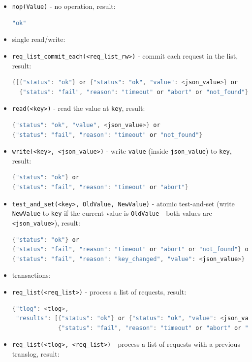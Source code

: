 \documentclass[a4paper]{scrreprt}
\newcommand{\code}[1]{\lstinline[basicstyle=\ttfamily]!#1!}
\begin{document}
\begin{itemize}
  \item \code{nop(Value)} - no operation, result:
\begin{lstlisting}[language=java]
"ok"
\end{lstlisting}
  \item[] \hspace{-1.7em}single read/write:
  \item \code{req_list_commit_each(<req_list_rw>)} - commit each request in the list, result:
\begin{lstlisting}[language=java]
{[{"status": "ok"} or {"status": "ok", "value": <json_value>} or
  {"status": "fail", "reason": "timeout" or "abort" or "not_found"}]}
\end{lstlisting}
  \item \code{read(<key>)} - read the value at \code{key}, result:
\begin{lstlisting}[language=java]
{"status": "ok", "value", <json_value>} or
{"status": "fail", "reason": "timeout" or "not_found"}
\end{lstlisting}
  \item \code{write(<key>, <json_value>)} - write \code{value} (inside \code{json_value}) to \code{key}, result:
\begin{lstlisting}[language=java]
{"status": "ok"} or
{"status": "fail", "reason": "timeout" or "abort"}
\end{lstlisting}
  \item \code{test_and_set(<key>, OldValue, NewValue)} - atomic test-and-set
  (write \code{NewValue} to \code{key} if the current value is \code{OldValue}
   - both values are \code{<json_value>}), result:
\begin{lstlisting}[language=java]
{"status": "ok"} or
{"status": "fail", "reason": "timeout" or "abort" or "not_found"} or
{"status": "fail", "reason": "key_changed", "value": <json_value>}
\end{lstlisting}
  \item[] \hspace{-1.7em}transactions:
  \item \code{req_list(<req_list>)} - process a list of requests, result:
\begin{lstlisting}[language=java]
{"tlog": <tlog>,
 "results": [{"status": "ok"} or {"status": "ok", "value": <json_value>} or
             {"status": "fail", "reason": "timeout" or "abort" or "not_found"}]}
\end{lstlisting}
  \item \code{req_list(<tlog>, <req_list>)} - process a list of requests with a previous translog, result:

\end{itemize}
\end{document}
